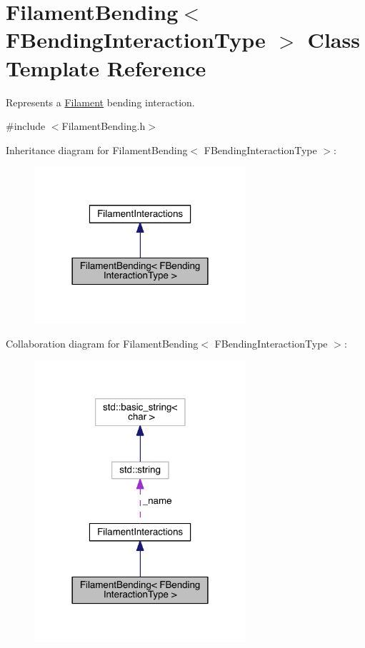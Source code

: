 \hypertarget{classFilamentBending}{\section{Filament\+Bending$<$ F\+Bending\+Interaction\+Type $>$ Class Template Reference}
\label{classFilamentBending}
}


Represents a \hyperlink{classFilament}{Filament} bending interaction.  




{\ttfamily \#include $<$Filament\+Bending.\+h$>$}



Inheritance diagram for Filament\+Bending$<$ F\+Bending\+Interaction\+Type $>$\+:\nopagebreak
\begin{figure}[H]
\begin{center}
\leavevmode
\includegraphics[width=222pt]{classFilamentBending__inherit__graph}
\end{center}
\end{figure}


Collaboration diagram for Filament\+Bending$<$ F\+Bending\+Interaction\+Type $>$\+:\nopagebreak
\begin{figure}[H]
\begin{center}
\leavevmode
\includegraphics[width=222pt]{classFilamentBending__coll__graph}
\end{center}
\end{figure}
